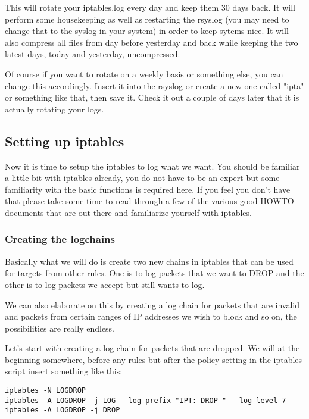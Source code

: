 \documentclass[english,twoside,openright,a4paper,12pt]{article}
\begin{document}
This will rotate your iptables.log every day and keep them 30 days
back. It will perform some housekeeping as well as restarting the
rsyslog (you may need to change that to the syslog in your system) in
order to keep sytems nice. It will also compress all files from day
before yesterday and back while keeping the two latest days, today and
yesterday, uncompressed.

Of course if you want to rotate on a weekly basis or something else,
you can change this accordingly. Insert it into the rsyslog or create
a new one called "ipta" or something like that, then save it. Check
it out a couple of days later that it is actually rotating your logs.

\subsection{Setting up iptables}

Now it is time to setup the iptables to log what we want. You should
be familiar a little bit with iptables already, you do not have to be
an expert but some familiarity with the basic functions is required
here. If you feel you don't have that please take some time to read
through a few of the various good HOWTO documents that are out there
and familiarize yourself with iptables.

\subsubsection{Creating the logchains}

Basically what we will do is create two new chains in iptables that
can be used for targets from other rules. One is to log packets that
we want to DROP and the other is to log packets we accept but still
wants to log.

We can also elaborate on this by creating a log chain for packets that
are invalid and packets from certain ranges of IP addresses we wish to
block and so on, the possibilities are really endless.

Let's start with creating a log chain for packets that are dropped. We
will at the beginning somewhere, before any rules but after the policy
setting in the iptables script insert something like this:

\small
\begin{verbatim}
iptables -N LOGDROP
iptables -A LOGDROP -j LOG --log-prefix "IPT: DROP " --log-level 7
iptables -A LOGDROP -j DROP
\end{verbatim}
\normalsize
\end{document}
